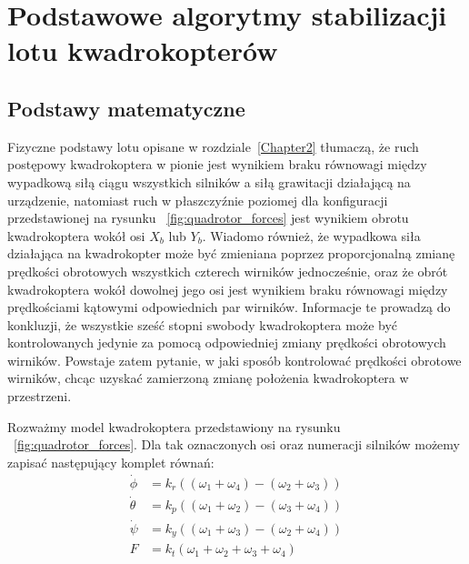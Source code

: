 


\chapter{Podstawowe algorytmy stabilizacji lotu kwadrokopterów} %

\label{Chapter3} %



\section{Podstawy matematyczne}

Fizyczne podstawy lotu opisane w rozdziale~\ref{Chapter2} tłumaczą, że ruch postępowy kwadrokoptera w pionie jest wynikiem braku równowagi między wypadkową siłą ciągu wszystkich silników a siłą grawitacji działającą na urządzenie, natomiast ruch w płaszczyźnie poziomej dla konfiguracji przedstawionej na rysunku ~\ref{fig:quadrotor_forces} jest wynikiem obrotu kwadrokoptera wokół osi $X_b$ lub $Y_b$. Wiadomo również, że wypadkowa siła działająca na kwadrokopter może być zmieniana poprzez proporcjonalną zmianę prędkości obrotowych wszystkich czterech wirników jednocześnie, oraz że obrót kwadrokoptera wokół dowolnej jego osi jest wynikiem braku równowagi między prędkościami kątowymi odpowiednich par wirników. Informacje te prowadzą do konkluzji, że wszystkie sześć stopni swobody kwadrokoptera może być kontrolowanych jedynie za pomocą odpowiedniej zmiany prędkości obrotowych wirników. Powstaje zatem pytanie, w jaki sposób kontrolować prędkości obrotowe wirników, chcąc uzyskać zamierzoną zmianę położenia kwadrokoptera w przestrzeni. 

Rozważmy model kwadrokoptera przedstawiony na rysunku ~\ref{fig:quadrotor_forces}. Dla tak oznaczonych osi oraz numeracji silników możemy zapisać następujący komplet równań:
\begin{equation}
\begin{aligned}
	\dot{\phi} &= k_r((\omega_1 + \omega_4) - (\omega_2 + \omega_3)) \\
	\dot{\theta} &= k_p((\omega_1 + \omega_2) - (\omega_3 + \omega_4)) \\
	\dot{\psi} &= k_y((\omega_1 + \omega_3) - (\omega_2 + \omega_4)) \\
	F &= k_t(\omega_1 + \omega_2 + \omega_3 + \omega_4)
\end{aligned}
\end{equation}

